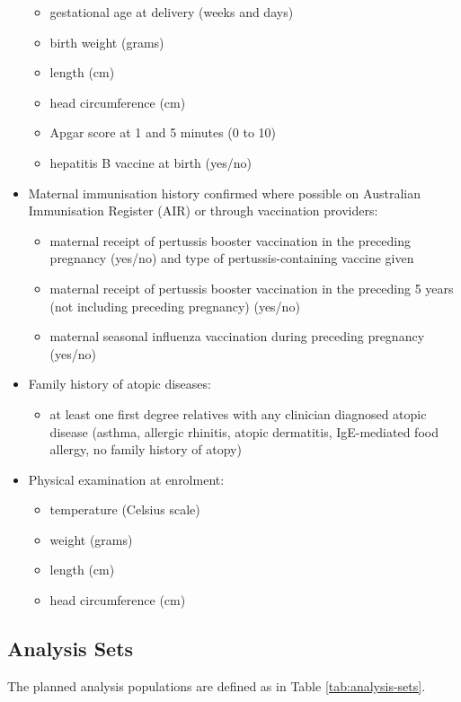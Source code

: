 \documentclass{bmcart}
\begin{document}
\begin{itemize}
\begin{itemize}
        \item gestational age at delivery (weeks and days)
        \item birth weight (grams)
        \item length (cm)
        \item head circumference (cm)
        \item Apgar score at 1 and 5 minutes (0 to 10)
        \item hepatitis B vaccine at birth (yes/no)
    \end{itemize}
    \item Maternal immunisation history confirmed where possible on Australian Immunisation Register (AIR) or through vaccination providers:
    \begin{itemize}
        \item maternal receipt of pertussis booster vaccination in the preceding pregnancy (yes/no) and type of pertussis-containing vaccine given
        \item maternal receipt of pertussis booster vaccination in the preceding 5 years (not including preceding pregnancy) (yes/no)
        \item maternal seasonal influenza vaccination during preceding pregnancy (yes/no)
    \end{itemize}
    \item Family history of atopic diseases:
    \begin{itemize}
  	    \item at least one first degree relatives with any clinician diagnosed atopic disease (asthma, allergic rhinitis, atopic dermatitis, IgE-mediated food allergy, no family history of atopy)
    \end{itemize}
	\item Physical examination at enrolment:
	\begin{itemize}
	    \item temperature (Celsius scale)
	    \item weight (grams)
	    \item length (cm)
	    \item head circumference (cm)
	\end{itemize}
\end{itemize}


\subsection*{Analysis Sets}

The planned analysis populations are defined as in Table \ref{tab:analysis-sets}.
\end{document}
